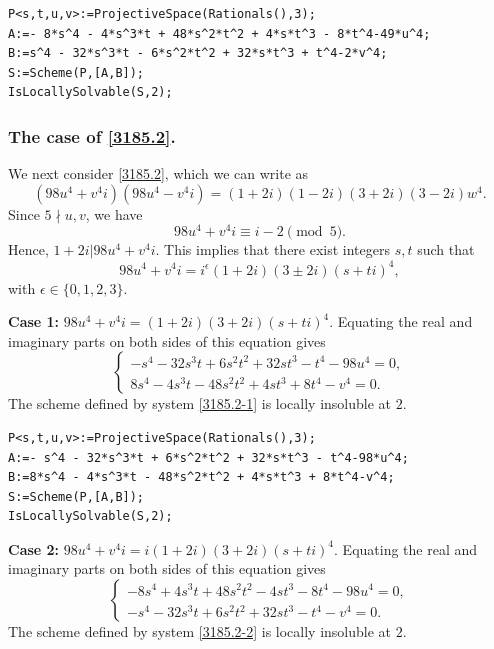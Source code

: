 \documentclass[a4paper,12pt,english,reqno]{amsart}
\begin{document}
\begin{lstlisting}
P<s,t,u,v>:=ProjectiveSpace(Rationals(),3);
A:=- 8*s^4 - 4*s^3*t + 48*s^2*t^2 + 4*s*t^3 - 8*t^4-49*u^4;
B:=s^4 - 32*s^3*t - 6*s^2*t^2 + 32*s*t^3 + t^4-2*v^4;
S:=Scheme(P,[A,B]);
IsLocallySolvable(S,2);
\end{lstlisting}


\subsubsection{\bf{The case of \eqref{3185.2}.}}
We next consider \eqref{3185.2}, which we can write as
\begin{equation} (98u^4+v^4i)(98u^4-v^4i)=(1+2i)(1-2i)(3+2i)(3-2i)w^4.
\end{equation}
Since $5\nmid u,v$, we have
\[98u^4+v^4i\equiv i-2\pmod{5}.\]
Hence, $1+2i|98u^4+v^4i$. This implies that there exist integers $s,t$ such that 
\[98u^4+v^4i=i^{\epsilon}(1+2i)(3\pm 2i)(s+ti)^4,\]
with $\epsilon \in \{0,1,2,3\}$.

{\bf Case 1:} $98u^4+v^4i=(1+2i)(3+2i)(s+ti)^4$. Equating the real and imaginary parts on both sides of this equation gives
\begin{equation}\label{3185.2-1}
\begin{cases}
-s^4 - 32s^3t + 6s^2t^2 + 32st^3 - t^4 - 98u^4=0,\\
8s^4 - 4s^3t - 48s^2t^2 + 4st^3 + 8t^4 - v^4=0.
\end{cases}
\end{equation}
The scheme defined by system \eqref{3185.2-1} is locally insoluble at $2$.

\begin{lstlisting}
P<s,t,u,v>:=ProjectiveSpace(Rationals(),3);
A:=- s^4 - 32*s^3*t + 6*s^2*t^2 + 32*s*t^3 - t^4-98*u^4;
B:=8*s^4 - 4*s^3*t - 48*s^2*t^2 + 4*s*t^3 + 8*t^4-v^4;
S:=Scheme(P,[A,B]);
IsLocallySolvable(S,2);
\end{lstlisting}

{\bf Case 2:} $98u^4+v^4i=i(1+2i)(3+2i)(s+ti)^4$. Equating the real and imaginary parts on both sides of this equation gives
\begin{equation}\label{3185.2-2}
\begin{cases}
-8s^4 + 4s^3t + 48s^2t^2 - 4st^3 - 8t^4 - 98u^4=0,\\
-s^4 - 32s^3t + 6s^2t^2 + 32st^3 - t^4 - v^4=0.
\end{cases}
\end{equation}
The scheme defined by system \eqref{3185.2-2} is locally insoluble at $2$.
\end{document}

